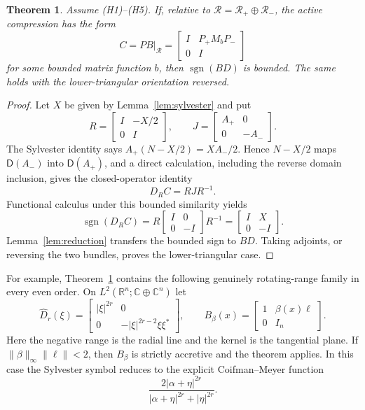 \documentclass[11pt]{article}
\newtheorem{theorem}{Theorem}
\newcommand{\Rr}{\mathcal R}
\newcommand{\Dom}{\mathsf D}
\newcommand{\sgn}{\operatorname{sgn}}
\begin{document}
\begin{theorem}\label{thm:triangular}
Assume (H1)--(H5).  If, relative to
$\Rr=\Rr_+\oplus\Rr_-$, the active compression has the form
\[
 C=P B|_{\Rr}=
 \begin{bmatrix}I&P_+M_bP_-\\0&I\end{bmatrix}
\]
for some bounded matrix function $b$, then $\sgn(BD)$ is bounded.  The same
holds with the lower-triangular orientation reversed.
\end{theorem}

\begin{proof}
Let $X$ be given by Lemma~\ref{lem:sylvester} and put
\[
 R=\begin{bmatrix}I&-X/2\\0&I\end{bmatrix},
 \qquad J=\begin{bmatrix}A_+&0\\0&-A_-\end{bmatrix}.
\]
The Sylvester identity says
$A_+(N-X/2)=XA_-/2$.  Hence $N-X/2$ maps
$\Dom(A_-)$ into $\Dom(A_+)$, and a direct calculation, including the reverse
domain inclusion, gives the closed-operator identity
\[
 D_RC=RJR^{-1}.
\]
Functional calculus under this bounded similarity yields
\[
 \sgn(D_RC)
 =R\begin{bmatrix}I&0\\0&-I\end{bmatrix}R^{-1}
 =\begin{bmatrix}I&X\\0&-I\end{bmatrix}.
\]
Lemma~\ref{lem:reduction} transfers the bounded sign to $BD$.  Taking
adjoints, or reversing the two bundles, proves the lower-triangular case.
\end{proof}

For example, Theorem~\ref{thm:triangular} contains the following genuinely
rotating-range family in every even order.  On
$L^2(\mathbb R^n;\mathbb C\oplus\mathbb C^n)$ let
\[
 \widehat D_r(\xi)=
 \begin{bmatrix}|\xi|^{2r}&0\\
 0&-|\xi|^{2r-2}\xi\xi^*\end{bmatrix},
 \qquad
 B_\beta(x)=\begin{bmatrix}1&\beta(x)\ell\\0&I_n\end{bmatrix}.
\]
Here the negative range is the radial line and the kernel is the tangential
plane.  If $\|\beta\|_\infty\|\ell\|<2$, then $B_\beta$ is strictly
accretive and the theorem applies.  In this case the Sylvester symbol reduces
to the explicit Coifman--Meyer function
\[
 \frac{2|\alpha+\eta|^{2r}}
 {|\alpha+\eta|^{2r}+|\eta|^{2r}}.
\]
\end{document}
